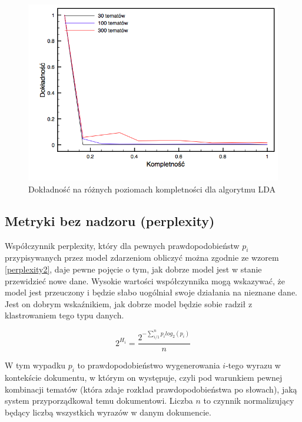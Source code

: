 \documentclass[11pt,a4paper]{article}
\begin{document}
\begin{figure}[h]
\includegraphics[width=\linewidth]{gfx/lda_precision.png}
\caption{Dokładność na różnych poziomach kompletności dla algorytmu LDA}
\label{fig:lda_precision}
\end{figure}

\FloatBarrier

\subsection{Metryki bez nadzoru (perplexity)}

Współczynnik perplexity, który dla pewnych prawdopodobieństw $p_i$
przypisywanych przez model zdarzeniom obliczyć można zgodnie ze wzorem
\ref{perplexity2}, daje pewne pojęcie o tym, jak dobrze model jest w stanie
przewidzieć nowe dane. Wysokie wartości współczynnika mogą wskazywać, że model
jest przeuczony i będzie słabo uogólniał swoje działania na nieznane dane. Jest
on dobrym wskaźnikiem, jak dobrze model będzie sobie radził z klastrowaniem tego
typu danych.

\begin{equation}
  \label{perplexity2}
  2^{H_i} = \frac{2^{-\sum_{i/1}^n p_ilog_2(p_i)}}{n}
\end{equation}

W tym wypadku $p_i$ to prawdopodobieństwo wygenerowania $i$-tego wyrazu w
kontekście dokumentu, w którym on występuje, czyli pod warunkiem pewnej
kombinacji tematów (która zdaje rozkład prawdopodobieństwa po słowach), jaką
system przyporządkował temu dokumentowi. Liczba $n$ to czynnik normalizujący
będący liczbą wszystkich wyrazów w danym dokumencie.
\end{document}
